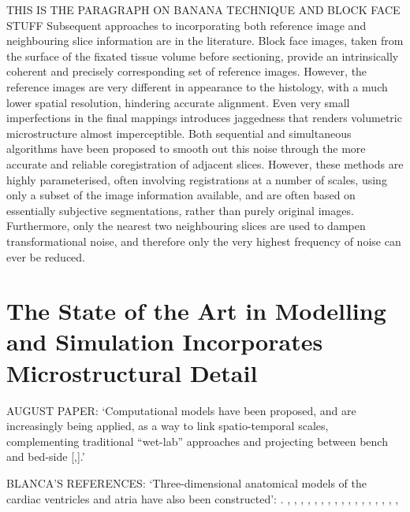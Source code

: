   THIS IS THE PARAGRAPH ON BANANA TECHNIQUE AND BLOCK FACE STUFF Subsequent approaches to incorporating both reference image and neighbouring slice information are in the literature. Block face images, taken from the surface of the fixated tissue volume before sectioning, provide an intrinsically coherent and precisely corresponding set of reference images. However, the reference images are very different in appearance to the histology, with a much lower spatial resolution, hindering accurate alignment. Even very small imperfections in the final mappings introduces jaggedness that renders volumetric microstructure almost imperceptible. Both sequential \cite{Chakravarty2008,Yushkevich2006} and simultaneous \cite{Feuerstein2011} algorithms have been proposed to smooth out this noise through the more accurate and reliable coregistration of adjacent slices. However, these methods are highly parameterised, often involving registrations at a number of scales, using only a subset of the image information available, and are often based on essentially subjective segmentations, rather than purely original images. Furthermore, only the nearest two neighbouring slices are used to dampen transformational noise, and therefore only the very highest frequency of noise can ever be reduced.
  

\section{The State of the Art in Modelling and Simulation Incorporates Microstructural Detail} %
\label{sec:the_state_of_the_art_in_microstructural_modelling_and_simulation_incorporates_microstructural_detail}
  AUGUST PAPER:
  `Computational models have been proposed, and are increasingly being applied, as a way to link spatio-temporal scales, complementing traditional “wet-lab” approaches and projecting between bench and bed-side [\cite{Hunter2010},\cite{Kohl2010}].'


  BLANCA'S REFERENCES:
  `Three-dimensional anatomical models of the cardiac ventricles and atria have also been constructed': \cite{Carusi2012}.
  \cite{Atkinson2011}, \cite{Baher2011}, \cite{Bishop2009}, \cite{Bordas2010}, \cite{Bordas2011}, \cite{Deo2009}, \cite{Keller2012}, \cite{Moreno2011}, \cite{Niederer2011}, \cite{Okada2011}, \cite{Potse2006}, \cite{Romero2010}, \cite{Seemann2006}, \cite{TenTusscher2007}, \cite{Trayanova2011}, \cite{Vadakkumpadan2010}, \cite{Zemzemi2011}, \cite{Zhao2012}
  
